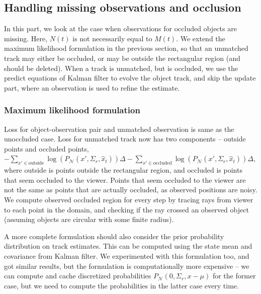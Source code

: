 \documentclass[a4paper]{article}
\newcommand{\N}{\mathcal{N}}
\newcommand{\x}{\hat{x}}
\begin{document}
\subsection{Handling missing observations and occlusion}

In this part, we look at the case when observations for occluded objects are missing.
Here, $N(t)$ is not necessarily equal to $M(t)$. We extend the maximum likelihood
formulation in the previous section, so that an unmatched track may either be occluded,
or may be outside the rectangular region (and should be deleted).
When a track is unmatched, but is occluded, we use the predict equations of Kalman filter
to evolve the object track, and skip the update part, where an observation is used to
refine the estimate.

\subsubsection{Maximum likelihood formulation}
Loss for object-observation pair and unmatched observation is same as the unoccluded case.
Loss for unmatched track now has two components --
outside points and occluded points, \\
$- \sum_{x' \in \text{outside}} \log(P_\N(x', \Sigma_r, \x_t)) \Delta - \sum_{x' \in \text{occluded}} \log(P_\N(x', \Sigma_r, \x_t)) \Delta$, \\
where outside is points outside the rectangular region,
and occluded is points that seem occluded to the viewer.
Points that seem occluded to the viewer are not the same as points that are actually
occluded, as observed positions are noisy.
We compute observed occluded region for every step by tracing rays from viewer to each
point in the domain, and checking if the ray crossed an observed object
(assuming objects are circular with some finite radius).

A more complete formulation should also consider the prior probability distribution
on track estimates.
This can be computed using the state mean and covariance from Kalman filter.
We experimented with this formulation too, and got similar results, but the formulation
is computationally more expensive -- we can compute and cache discretized
probabilities $P_\N(0, \Sigma_r, x-\mu)$ for the former case,
but we need to compute the probabilities in the latter case every time.
\end{document}
